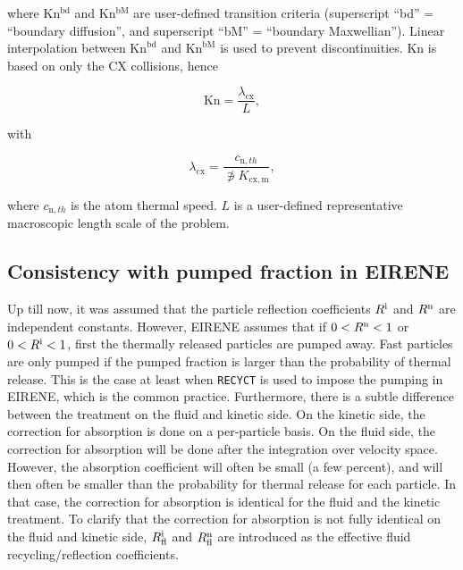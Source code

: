 \noindent where $\mathrm{Kn^{
bd}}$ and $\mathrm{Kn^{bM}}$ are user-defined transition criteria (superscript ``bd'' = ``boundary diffusion'', and superscript ``bM'' = ``boundary Maxwellian''). Linear interpolation between $\mathrm{Kn}^{\mathrm{bd}}$ and $\mathrm{Kn}^{\mathrm{bM}}$ is used to prevent discontinuities. $\mathrm{Kn}$ is based on only the CX collisions, hence

\begin{equation}
    \mathrm{Kn} = \frac{\lambda_\mathrm{cx}}{L},
\end{equation}

\noindent with

\begin{equation}\label{eq:lambda_cx}
    \lambda_\mathrm{cx} = \frac{c_{\mathrm{n},th}}{\nni K_\mathrm{cx,m}},
\end{equation}

\noindent where $c_{\mathrm{n},th}$ is the atom thermal speed. $L$ is a user-defined representative macroscopic length scale of the problem.

\subsection{Consistency with pumped fraction in EIRENE} \label{sec:pumped_fraction}

Up till now, it was assumed that the particle reflection coefficients $R^{\mathrm{i}}$ and $R^{\mathrm{n}}$ are independent constants. However, EIRENE assumes that if $0<R^{\mathrm{n}} <1$ or $ 0 < R^{\mathrm{i}} < 1$, first the thermally released particles are pumped away. Fast particles are only pumped if the pumped fraction is larger than the probability of thermal release. This is the case at least when {\tt RECYCT} is used to impose the pumping in EIRENE, which is the common practice. Furthermore, there is a subtle difference between the treatment on the fluid and kinetic side. On the kinetic side, the correction for absorption is done on a per-particle basis. On the fluid side, the correction for absorption will be done after the integration over velocity space.
However, the absorption coefficient will often be small (a few percent), and will then often be smaller than the probability for thermal release for each particle.
In that case, the correction for absorption is identical for the fluid and the kinetic treatment. To clarify that the correction for absorption is not fully identical on the fluid and kinetic side, $R^{\mathrm{i}}_\mathrm{fl}$ and $R^{\mathrm{n}}_\mathrm{fl}$ are introduced as the effective fluid recycling/reflection coefficients.

